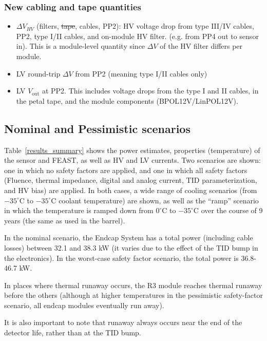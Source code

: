 \subsubsection{New cabling and tape quantities}

\begin{itemize}
\setlength\itemsep{0.0em}
\item $\Delta V_{HV}$ (filters, \sout{tape}, cables, PP2): HV voltage drop from type
III/IV cables, PP2, type I/II cables, and on-module HV filter. (e.g. from PP4 out to sensor in).
This is a module-level quantity since $\Delta V$ of the HV filter differs per module.
\item LV round-trip $\Delta V$ from PP2 (meaning type I/II cables only)
\item LV $V_\text{out}$ at PP2. This includes voltage drops from the type I and II cables, in the
  petal tape, and the module components (BPOL12V/LinPOL12V).
\end{itemize}

\subsection{Nominal and Pessimistic scenarios}

Table~\ref{results_summary} shows the power estimates, properties (temperature) of the sensor and
FEAST, as well as HV and LV currents. Two scenarios are shown: one in which no safety factors are
applied, and one in which all safety factors (Fluence, thermal impedance, digital and analog current,
TID parameterization, and HV bias) are applied. In both cases, a wide range of cooling scenarios
(from $-35^\circ$C to $-35^\circ$C coolant temperature) are shown, as well as the ``ramp'' scenario
in which the temperature is ramped down from $0^\circ$C to $-35^\circ$C over the course of 9 years
(the same as used in the barrel).

In the nominal scenario, the Endcap System has a total power (including cable losses) between 32.1
and 38.3 kW (it varies due to the effect of the TID bump in the electronics).
In the worst-case safety factor scenario, the total power is 36.8-46.7 kW.

In places where thermal runaway occurs, the R3 module reaches thermal runaway before the others
(although at higher temperatures in the pessimistic safety-factor scenario, all endcap modules
eventually run away).

It is also important to note that runaway always occurs near the end of the detector life, rather than
at the TID bump.

